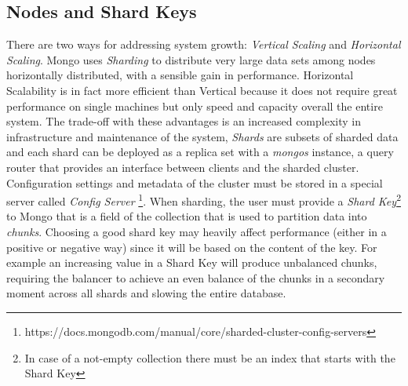\subsection{Nodes and Shard Keys}
There are two ways for addressing system growth: \textit{Vertical Scaling} and \textit{Horizontal Scaling}. Mongo uses \textit{Sharding} to distribute very large data sets among nodes horizontally distributed, with a sensible gain in performance.
Horizontal Scalability is in fact more efficient than Vertical because it does not require great performance on single machines but only speed and capacity overall the entire system. The trade-off with these advantages is an increased complexity in infrastructure and maintenance of the system,
\textit{Shards} are subsets of sharded data and each shard can be deployed as a replica set with a \textit{mongos} instance, a query router that provides an interface between clients and the sharded cluster.
Configuration settings and metadata of the cluster must be stored in a special server called \textit{Config Server} \footnote{https://docs.mongodb.com/manual/core/sharded-cluster-config-servers}.
When sharding, the user must provide a \textit{Shard Key}\footnote{In case of a not-empty collection there must be an index that starts with the Shard Key} to Mongo that is a field of the collection that is used to partition data into \textit{chunks}. Choosing a good shard key may heavily affect performance (either in a positive or negative way) since it will be based on the content of the key. For example an increasing value in a Shard Key will produce unbalanced chunks, requiring the balancer to achieve an even balance of the chunks in a secondary moment across all shards and slowing the entire database.

